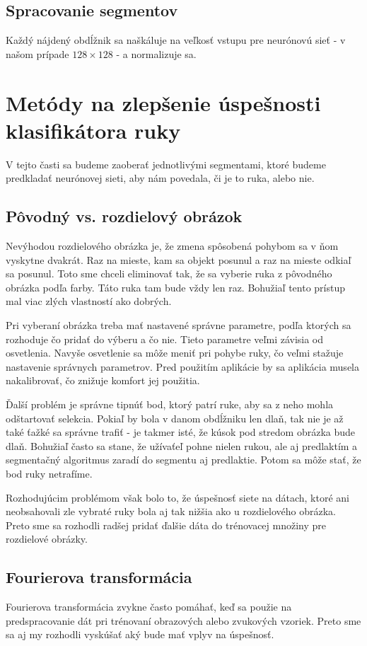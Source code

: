 \subsection{Spracovanie segmentov}
Každý nájdený obdĺžnik sa naškáluje na veľkosť vstupu pre neurónovú sieť - v našom prípade $128\times 128$ - a normalizuje sa.

\section{Metódy na zlepšenie úspešnosti klasifikátora ruky}
\label{sect:metodyzlepseniaklasifikacie}

V tejto časti sa budeme zaoberať jednotlivými segmentami, ktoré budeme predkladať neurónovej sieti, aby nám povedala, či je to ruka, alebo nie.

\subsection{Pôvodný vs. rozdielový obrázok}
Nevýhodou rozdielového obrázka je, že zmena spôsobená pohybom sa v ňom vyskytne dvakrát. Raz na mieste, kam sa objekt posunul a raz na mieste odkiaľ sa posunul. Toto sme chceli eliminovať tak, že sa vyberie ruka z pôvodného obrázka podľa farby. Táto ruka tam bude vždy len raz. Bohužiaľ tento prístup mal viac zlých vlastností ako dobrých.

Pri vyberaní obrázka treba mať nastavené správne parametre, podľa ktorých sa rozhoduje čo pridať do výberu a čo nie. Tieto parametre veľmi závisia od osvetlenia. Navyše osvetlenie sa môže meniť pri pohybe ruky, čo veľmi stažuje nastavenie správnych parametrov. Pred použitím aplikácie by sa aplikácia musela nakalibrovať, čo znižuje komfort jej použitia.

Ďalší problém je správne tipnúť bod, ktorý patrí ruke, aby sa z neho mohla odštartovať selekcia. Pokiaľ by bola v danom obdĺžniku len dlaň, tak nie je až také ťažké sa správne trafiť - je takmer isté, že kúsok pod stredom obrázka bude dlaň. Bohužiaľ často sa stane, že užívaťeľ pohne nielen rukou, ale aj predlaktím a segmentačný algoritmus zaradí do segmentu aj predlaktie. Potom sa môže stať, že bod ruky netrafíme.

Rozhodujúcim problémom však bolo to, že úspešnosť siete na dátach, ktoré ani neobsahovali zle vybraté ruky bola aj tak nižšia ako u rozdielového obrázka. Preto sme sa rozhodli radšej pridať ďalšie dáta do trénovacej množiny pre rozdielové obrázky.

\subsection{Fourierova transformácia}
Fourierova transformácia zvykne často pomáhať, keď sa použie na predspracovanie dát pri trénovaní obrazových alebo zvukových vzoriek. Preto sme sa aj my rozhodli vyskúšať aký bude mať vplyv na úspešnosť.

